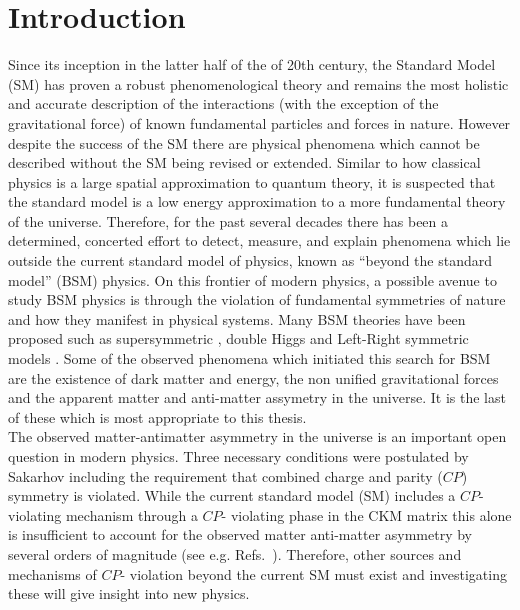 \documentclass[10pt,a4paper, twoside]{report}
\begin{document}
\chapter{Introduction} \label{chap:P1Intro}
Since its inception in the latter half of the of 20th century, the Standard Model (SM) has proven a robust phenomenological theory and remains the most holistic and accurate description of the interactions (with the exception of  the gravitational force) of known fundamental particles and forces in nature. However despite the success of the SM  there are  physical phenomena which cannot be described without the SM being revised or extended. Similar to how classical physics is a large spatial approximation to quantum theory, it is suspected that the standard model is a low energy approximation to a more fundamental theory of the universe.  Therefore, for the past several decades there has been a determined, concerted effort to detect, measure, and explain phenomena which lie outside the current standard model of physics, known as ``beyond the standard model'' (BSM) physics. On this frontier of modern physics, a possible avenue to study BSM physics is through the violation of fundamental symmetries of nature and how they manifest in physical systems. Many BSM theories have been proposed such as supersymmetric \cite{Fayet1976, Fayet1977, Pospelov2005, Ramsey2008}, double Higgs \cite{Inoue2014} and Left-Right symmetric models \cite{Pati1974}. Some of the observed phenomena which initiated this search for BSM are the existence of dark matter and energy, the non unified gravitational forces and the apparent matter and anti-matter assymetry in the universe. It is the last of these which is most appropriate to this thesis. \\
\linebreak
 The observed matter-antimatter asymmetry in the universe is an important open question in modern physics. Three necessary conditions were postulated by Sakarhov\cite{Sakharov1967} including the requirement that combined charge and parity ($CP$) symmetry  is violated. While the current standard model (SM)  includes a $CP$- violating mechanism through a $CP$- violating phase in the CKM matrix \cite{KM1973} this alone is insufficient to account for the observed matter anti-matter asymmetry by several orders of magnitude (see e.g. Refs.~\cite{Sakharov1967,Farrar1993, Huet1994, Pospelov2005, Canetti2012, FS2010}). Therefore, other sources and mechanisms of $CP$- violation beyond the current SM must exist and investigating these will give insight into new physics. \\ 
\end{document}
